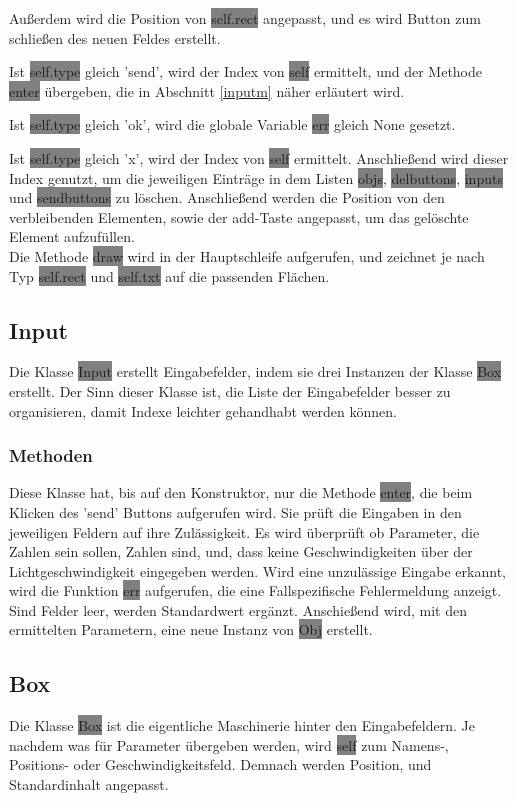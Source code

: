 \documentclass[12pt]{article}
\begin{document}
Außerdem wird die Position von \colorbox{gray}{self.rect} angepasst, und es wird Button zum schließen des neuen Feldes erstellt.

Ist \colorbox{gray}{self.type} gleich 'send', wird der Index von \colorbox{gray}{self} ermittelt, und der Methode \colorbox{gray}{enter} übergeben, die in Abschnitt \ref{inputm} näher erläutert wird.

Ist \colorbox{gray}{self.type} gleich 'ok', wird die globale Variable \colorbox{gray}{err} gleich None gesetzt.

Ist \colorbox{gray}{self.type} gleich 'x', wird der Index von \colorbox{gray}{self} ermittelt.
Anschließend wird dieser Index genutzt, um die jeweiligen Einträge in dem Listen \colorbox{gray}{objs}, \colorbox{gray}{delbuttons}, \colorbox{gray}{inputs} und \colorbox{gray}{sendbuttons} zu löschen.
Anschließend werden die Position von den verbleibenden Elementen, sowie der add-Taste angepasst, um das gelöschte Element aufzufüllen.
\\

Die Methode \colorbox{gray}{draw} wird in der Hauptschleife aufgerufen, und zeichnet je nach Typ \colorbox{gray}{self.rect} und \colorbox{gray}{self.txt} auf die passenden Flächen.
\subsection{Input}
Die Klasse \colorbox{gray}{Input} erstellt Eingabefelder, indem sie drei Instanzen der Klasse \colorbox{gray}{Box} erstellt.
Der Sinn dieser Klasse ist, die Liste der Eingabefelder besser zu organisieren, damit Indexe leichter gehandhabt werden können.
\subsubsection{Methoden}
Diese Klasse hat, bis auf den Konstruktor, nur die Methode \colorbox{gray}{enter}, die beim Klicken des 'send' Buttons aufgerufen wird.
Sie prüft die Eingaben in den jeweiligen Feldern auf ihre Zulässigkeit.
Es wird überprüft ob Parameter, die Zahlen sein sollen, Zahlen sind, und, dass keine Geschwindigkeiten über der Lichtgeschwindigkeit eingegeben werden.
Wird eine unzulässige Eingabe erkannt, wird die Funktion \colorbox{gray}{err} aufgerufen, die eine Fallspezifische Fehlermeldung anzeigt.
Sind Felder leer, werden Standardwert ergänzt.
Anschießend wird, mit den ermittelten Parametern, eine neue Instanz von \colorbox{gray}{Obj} erstellt.
\label{inputm}
\subsection{Box}
Die Klasse \colorbox{gray}{Box} ist die eigentliche Maschinerie hinter den Eingabefeldern.
Je nachdem was für Parameter übergeben werden, wird \colorbox{gray}{self} zum Namens-, Positions- oder Geschwindigkeitsfeld.
Demnach werden Position, und Standardinhalt angepasst.
\end{document}
